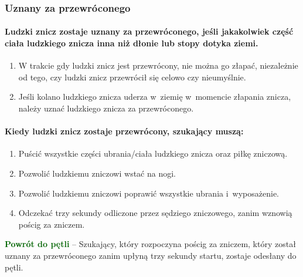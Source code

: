 \documentclass[12pt]{article}
\newcommand\other[1]{\bgroup\textcolor{darkgreen}{\textbf{#1}}}
\begin{document}
\subsubsection{Uznany za przewróconego}

\paragraph{Ludzki znicz zostaje uznany za przewróconego, jeśli
	jakakolwiek część ciała ludzkiego znicza inna niż dłonie lub stopy
	dotyka ziemi.}

\begin{enumerate}
	\item W trakcie gdy ludzki znicz jest przewrócony, nie można go złapać,
	      niezależnie od tego, czy ludzki znicz przewrócił się celowo czy
	      nieumyślnie.

	\item Jeśli kolano ludzkiego znicza uderza w~ziemię w~momencie złapania
	      znicza, należy uznać ludzkiego znicza za przewróconego.
\end{enumerate}

\paragraph{Kiedy ludzki znicz zostaje przewrócony, szukający
	muszą:}

\begin{enumerate}
	\item Puścić wszystkie części ubrania/ciała ludzkiego znicza oraz piłkę
	      zniczową.

	\item Pozwolić ludzkiemu zniczowi wstać na nogi.

	\item Pozwolić ludzkiemu zniczowi poprawić wszystkie ubrania i~wyposażenie.

	\item Odczekać trzy sekundy odliczone przez sędziego zniczowego, zanim
	      wznowią pościg za zniczem.
\end{enumerate}

\other{Powrót do pętli} -- Szukający, który rozpoczyna pościg za zniczem,
który został uznany za przewróconego zanim upłyną trzy sekundy startu,
zostaje odesłany do pętli.
\end{document}
